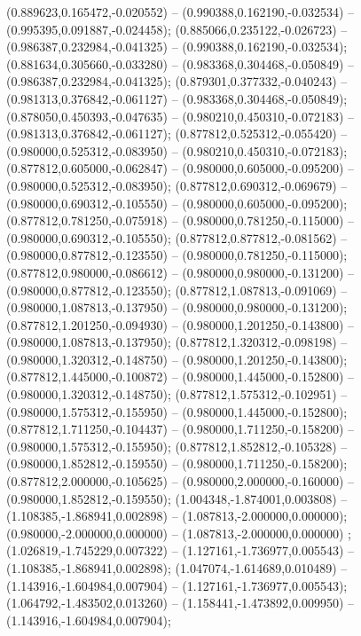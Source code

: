  (0.889623,0.165472,-0.020552) -- (0.990388,0.162190,-0.032534) -- (0.995395,0.091887,-0.024458);
 (0.885066,0.235122,-0.026723) -- (0.986387,0.232984,-0.041325) -- (0.990388,0.162190,-0.032534);
 (0.881634,0.305660,-0.033280) -- (0.983368,0.304468,-0.050849) -- (0.986387,0.232984,-0.041325);
 (0.879301,0.377332,-0.040243) -- (0.981313,0.376842,-0.061127) -- (0.983368,0.304468,-0.050849);
 (0.878050,0.450393,-0.047635) -- (0.980210,0.450310,-0.072183) -- (0.981313,0.376842,-0.061127);
 (0.877812,0.525312,-0.055420) -- (0.980000,0.525312,-0.083950) -- (0.980210,0.450310,-0.072183);
 (0.877812,0.605000,-0.062847) -- (0.980000,0.605000,-0.095200) -- (0.980000,0.525312,-0.083950);
 (0.877812,0.690312,-0.069679) -- (0.980000,0.690312,-0.105550) -- (0.980000,0.605000,-0.095200);
 (0.877812,0.781250,-0.075918) -- (0.980000,0.781250,-0.115000) -- (0.980000,0.690312,-0.105550);
 (0.877812,0.877812,-0.081562) -- (0.980000,0.877812,-0.123550) -- (0.980000,0.781250,-0.115000);
 (0.877812,0.980000,-0.086612) -- (0.980000,0.980000,-0.131200) -- (0.980000,0.877812,-0.123550);
 (0.877812,1.087813,-0.091069) -- (0.980000,1.087813,-0.137950) -- (0.980000,0.980000,-0.131200);
 (0.877812,1.201250,-0.094930) -- (0.980000,1.201250,-0.143800) -- (0.980000,1.087813,-0.137950);
 (0.877812,1.320312,-0.098198) -- (0.980000,1.320312,-0.148750) -- (0.980000,1.201250,-0.143800);
 (0.877812,1.445000,-0.100872) -- (0.980000,1.445000,-0.152800) -- (0.980000,1.320312,-0.148750);
 (0.877812,1.575312,-0.102951) -- (0.980000,1.575312,-0.155950) -- (0.980000,1.445000,-0.152800);
 (0.877812,1.711250,-0.104437) -- (0.980000,1.711250,-0.158200) -- (0.980000,1.575312,-0.155950);
 (0.877812,1.852812,-0.105328) -- (0.980000,1.852812,-0.159550) -- (0.980000,1.711250,-0.158200);
 (0.877812,2.000000,-0.105625) -- (0.980000,2.000000,-0.160000) -- (0.980000,1.852812,-0.159550);
 (1.004348,-1.874001,0.003808) -- (1.108385,-1.868941,0.002898) -- (1.087813,-2.000000,0.000000);
 (0.980000,-2.000000,0.000000) -- (1.087813,-2.000000,0.000000) ;
 (1.026819,-1.745229,0.007322) -- (1.127161,-1.736977,0.005543) -- (1.108385,-1.868941,0.002898);
 (1.047074,-1.614689,0.010489) -- (1.143916,-1.604984,0.007904) -- (1.127161,-1.736977,0.005543);
 (1.064792,-1.483502,0.013260) -- (1.158441,-1.473892,0.009950) -- (1.143916,-1.604984,0.007904);
